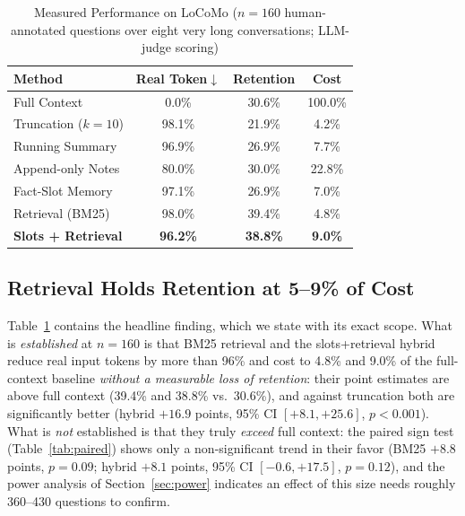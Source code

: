 \documentclass[conference]{IEEEtran}
\begin{document}
\begin{table}[h]
\centering
\caption{Measured Performance on LoCoMo ($n=160$ human-annotated questions over eight very long conversations; LLM-judge scoring)}
\label{tab:results}
\scriptsize
\setlength{\tabcolsep}{3pt}
\begin{tabular}{lccc}
\toprule
\textbf{Method} & \textbf{Real Token$\downarrow$} & \textbf{Retention} & \textbf{Cost} \\
\midrule
Full Context & 0.0\% & 30.6\% & 100.0\% \\
Truncation ($k{=}10$) & 98.1\% & 21.9\% & 4.2\% \\
Running Summary & 96.9\% & 26.9\% & 7.7\% \\
Append-only Notes & 80.0\% & 30.0\% & 22.8\% \\
Fact-Slot Memory & 97.1\% & 26.9\% & 7.0\% \\
Retrieval (BM25) & 98.0\% & 39.4\% & 4.8\% \\
\textbf{Slots + Retrieval} & \textbf{96.2\%} & \textbf{38.8\%} & \textbf{9.0\%} \\
\bottomrule
\end{tabular}
\end{table}

\subsection{Retrieval Holds Retention at 5--9\% of Cost}

Table~\ref{tab:results} contains the headline finding, which we state with its exact scope. What is \emph{established} at $n{=}160$ is that BM25 retrieval and the slots+retrieval hybrid reduce real input tokens by more than 96\% and cost to 4.8\% and 9.0\% of the full-context baseline \emph{without a measurable loss of retention}: their point estimates are above full context (39.4\% and 38.8\% vs.\ 30.6\%), and against truncation both are significantly better (hybrid $+16.9$ points, 95\% CI $[+8.1, +25.6]$, $p<0.001$). What is \emph{not} established is that they truly \emph{exceed} full context: the paired sign test (Table~\ref{tab:paired}) shows only a non-significant trend in their favor (BM25 $+8.8$ points, $p=0.09$; hybrid $+8.1$ points, 95\% CI $[-0.6, +17.5]$, $p=0.12$), and the power analysis of Section~\ref{sec:power} indicates an effect of this size needs roughly 360--430 questions to confirm.
\end{document}
